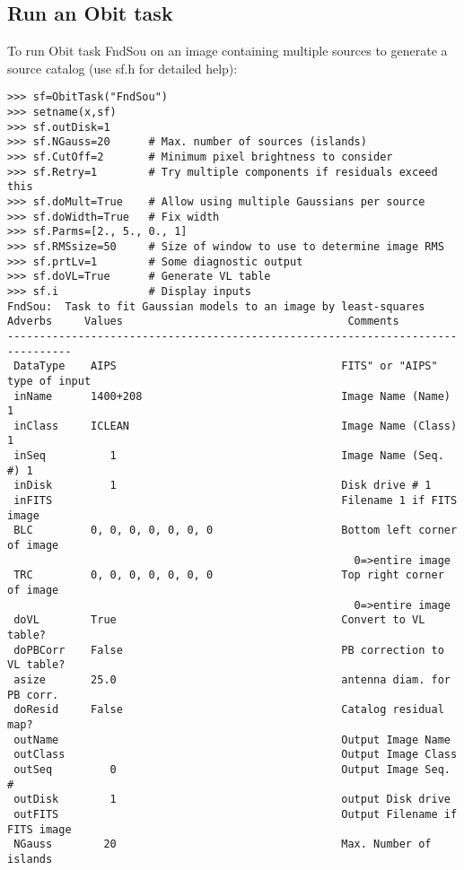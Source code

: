 \documentclass[11pt]{report}
\begin{document}
\subsection{Run an Obit task}
To run Obit task FndSou on an image containing multiple sources to
generate a source catalog (use sf.h for detailed help):
\begin{verbatim}
>>> sf=ObitTask("FndSou")
>>> setname(x,sf)
>>> sf.outDisk=1
>>> sf.NGauss=20      # Max. number of sources (islands)
>>> sf.CutOff=2       # Minimum pixel brightness to consider
>>> sf.Retry=1        # Try multiple components if residuals exceed this
>>> sf.doMult=True    # Allow using multiple Gaussians per source
>>> sf.doWidth=True   # Fix width
>>> sf.Parms=[2., 5., 0., 1]
>>> sf.RMSsize=50     # Size of window to use to determine image RMS
>>> sf.prtLv=1        # Some diagnostic output
>>> sf.doVL=True      # Generate VL table
>>> sf.i              # Display inputs
FndSou:  Task to fit Gaussian models to an image by least-squares
Adverbs     Values                                   Comments
--------------------------------------------------------------------------------
 DataType    AIPS                                   FITS" or "AIPS" type of input
 inName      1400+208                               Image Name (Name) 1
 inClass     ICLEAN                                 Image Name (Class) 1
 inSeq          1                                   Image Name (Seq. #) 1
 inDisk         1                                   Disk drive # 1
 inFITS                                             Filename 1 if FITS image
 BLC         0, 0, 0, 0, 0, 0, 0                    Bottom left corner of image
                                                      0=>entire image
 TRC         0, 0, 0, 0, 0, 0, 0                    Top right corner of image
                                                      0=>entire image
 doVL        True                                   Convert to VL table?
 doPBCorr    False                                  PB correction to VL table?
 asize       25.0                                   antenna diam. for PB corr.
 doResid     False                                  Catalog residual map?
 outName                                            Output Image Name
 outClass                                           Output Image Class
 outSeq         0                                   Output Image Seq. #
 outDisk        1                                   output Disk drive
 outFITS                                            Output Filename if FITS image
 NGauss        20                                   Max. Number of islands

\end{verbatim}
\end{document}

